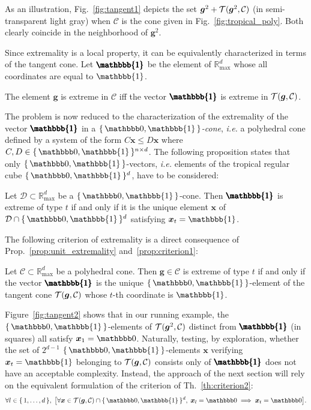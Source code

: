 \documentclass[proceedings]{stacs}
\newcommand{\maxplus}{\mathbb{R}_{\max}}
\newcommand{\mpone}{\mathbbb{1}}
\newcommand{\mponevect}{\pmb{\mpone}}\newcommand{\ie}{\textit{i.e.}}
\newcommand{\vect}[1]{\boldsymbol #1}
\newcommand{\CC}{\mathcal{C}}
\newcommand{\DD}{\mathcal{D}}
\newcommand{\mpzeroone}{\{\,\mpzero,\mpone\,\}}\newcommand{\mponealt}{\mpone}
\begin{document}
As an illustration, Fig.~\ref{fig:tangent1} depicts the set $\vect{g}^2 + \tangent(\vect{g}^2,\CC)$ (in semi-transparent light gray) when $\CC$ is the cone given in Fig.~\ref{fig:tropical_poly}. Both clearly coincide in the neighborhood of $\vect{g}^2$.


Since extremality is a local property, it can be equivalently
characterized in terms of the tangent cone. Let $\mponevect$ be the element of $\maxplus^d$ whose all coordinates are equal to $\mpone$.
\begin{proposition}\label{prop:unit_extremality}
The element $\vect{g}$
is extreme in $\CC$ iff the vector $\mponevect$ is extreme in 
$\tangent(\vect{g}, \CC)$.
\end{proposition}
The problem is now reduced to the characterization of the extremality of the vector $\mponevect$ in a \emph{$\mpzeroone$-cone}, \ie{} a polyhedral cone defined by a system of the form $C \vect{x} \leq D \vect{x}$ where $C, D \in \mpzeroone^{n \times d}$. The following proposition states that only $\mpzeroone$-vectors, \ie{} elements of the tropical regular cube $\mpzeroone^d$, have to be considered:
\begin{proposition}\label{prop:criterion1}
Let $\DD \subset \maxplus^d$ be a $\mpzeroone$-cone. 
Then $\mponevect$ is extreme of type $t$ if and only if it is the unique element $\vect{x}$ of $\DD \cap \mpzeroone^d$ satisfying $\vect{x}_t = \mponealt$.
\end{proposition}

The following criterion of extremality is a direct consequence of Prop.~\ref{prop:unit_extremality} and~\ref{prop:criterion1}:
\begin{theorem}\label{th:criterion2}
Let $\CC \subset \maxplus^d$ be a polyhedral cone. Then $\vect{g} \in \CC$ is extreme of type $t$ if and only if the vector $\mponevect$ is the unique $\mpzeroone$-element of the tangent cone $\tangent(\vect{g},\CC)$ whose $t$-th coordinate is $\mponealt$.
\end{theorem}


Figure~\ref{fig:tangent2} shows that in our running example, the $\mpzeroone$-elements of $\tangent(\vect{g}^2, \CC)$ distinct from $\mponevect$ (in squares) all satisfy $\vect{x}_1 = \mpzero$.
Naturally, testing, by exploration, whether the set of $2^{d-1}$ $\mpzeroone$-elements $\vect{x}$ verifying $\vect{x}_t = \mponealt$ belonging to $\tangent(\vect{g},\CC)$ 
consists only of $\mponevect$ 
does not have an acceptable complexity. Instead, the approach of the next section will rely on the equivalent formulation of the criterion of Th.~\ref{th:criterion2}:
\begin{equation}
\forall l \in \{\, 1, \dots, d\, \}, \; \bigl[\forall \vect{x} \in \tangent(\vect{g},\CC) \cap \mpzeroone^d,\; \vect{x}_l = \mpzero \implies \vect{x}_t = \mpzero \bigr]\label{eq:criterion3}.
\end{equation}
\end{document}
